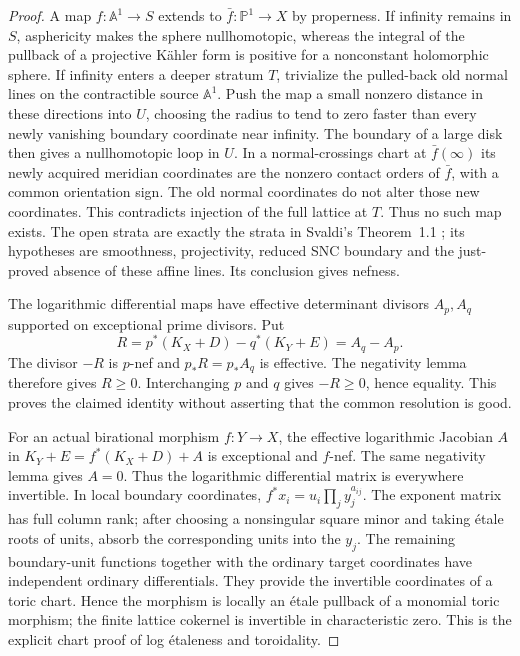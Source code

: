 \begin{proof}
A map $f:\mathbb A^1\to S$ extends to $\bar f:\mathbb P^1\to X$ by properness. If infinity remains in $S$, asphericity makes the sphere nullhomotopic, whereas the integral of the pullback of a projective K\"ahler form is positive for a nonconstant holomorphic sphere. If infinity enters a deeper stratum $T$, trivialize the pulled-back old normal lines on the contractible source $\mathbb A^1$. Push the map a small nonzero distance in these directions into $U$, choosing the radius to tend to zero faster than every newly vanishing boundary coordinate near infinity. The boundary of a large disk then gives a nullhomotopic loop in $U$. In a normal-crossings chart at $\bar f(\infty)$ its newly acquired meridian coordinates are the nonzero contact orders of $\bar f$, with a common orientation sign. The old normal coordinates do not alter those new coordinates. This contradicts injection of the full lattice at $T$. Thus no such map exists. The open strata are exactly the strata in Svaldi's Theorem~1.1 \cite{Svaldi2019}; its hypotheses are smoothness, projectivity, reduced SNC boundary and the just-proved absence of these affine lines. Its conclusion gives nefness.

The logarithmic differential maps have effective determinant divisors $A_p,A_q$ supported on exceptional prime divisors. Put
\[
 R=p^*(K_X+D)-q^*(K_Y+E)=A_q-A_p.
\]
The divisor $-R$ is $p$-nef and $p_*R=p_*A_q$ is effective. The negativity lemma therefore gives $R\geq0$. Interchanging $p$ and $q$ gives $-R\geq0$, hence equality. This proves the claimed identity without asserting that the common resolution is good.

For an actual birational morphism $f:Y\to X$, the effective logarithmic Jacobian $A$ in $K_Y+E=f^*(K_X+D)+A$ is exceptional and $f$-nef. The same negativity lemma gives $A=0$. Thus the logarithmic differential matrix is everywhere invertible. In local boundary coordinates, $f^*x_i=u_i\prod_j y_j^{a_{ij}}$. The exponent matrix has full column rank; after choosing a nonsingular square minor and taking \'etale roots of units, absorb the corresponding units into the $y_j$. The remaining boundary-unit functions together with the ordinary target coordinates have independent ordinary differentials. They provide the invertible coordinates of a toric chart. Hence the morphism is locally an \'etale pullback of a monomial toric morphism; the finite lattice cokernel is invertible in characteristic zero. This is the explicit chart proof of log \'etaleness and toroidality.
\end{proof}

